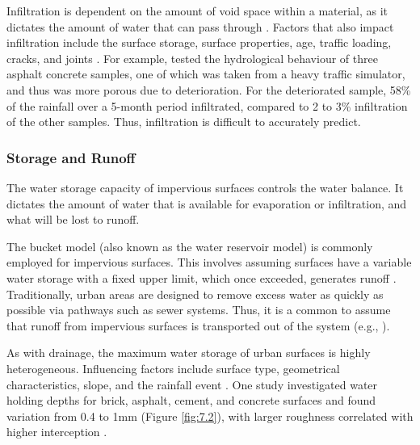 \documentclass[final,3p,times,authoryear]{elsarticle}
\begin{document}
Infiltration is dependent on the amount of void space within a material, as it dictates the amount of water that can pass through \citep{Aboufoul2017}. Factors that also impact infiltration include the surface storage, surface properties, age, traffic loading, cracks, and joints \citep{Redfern2016,Rammal2020}. For example, \cite{Ramier2004} tested the hydrological behaviour of three asphalt concrete samples, one of which was taken from a heavy traffic simulator, and thus was more porous due to deterioration. For the deteriorated sample, 58\% of the rainfall over a 5-month period infiltrated, compared to 2 to 3\% infiltration of the other samples. Thus, infiltration is difficult to accurately predict.

\subsubsection{Storage and Runoff}\label{sec:appendix7.1.3.3}

The water storage capacity of impervious surfaces controls the water balance. It dictates the amount of water that is available for evaporation or infiltration, and what will be lost to runoff.

The bucket model (also known as the water reservoir model) is commonly employed for impervious surfaces. This involves assuming surfaces have a variable water storage with a fixed upper limit, which once exceeded, generates runoff \citep{Rammal2020}. Traditionally, urban areas are designed to remove excess water as quickly as possible via pathways such as sewer systems. Thus, it is a common to assume that runoff from impervious surfaces is transported out of the system (e.g., \cite{Kronaveter2001}).

As with drainage, the maximum water storage of urban surfaces is highly
heterogeneous. Influencing factors include surface type, geometrical characteristics, slope, and the rainfall event \citep{Rammal2020}. One study investigated water holding depths for brick, asphalt, cement, and concrete surfaces and found variation from 0.4 to 1mm (Figure \ref{fig:7.2}), with larger roughness correlated with higher interception \citep{Zhou2021a}.
\end{document}
